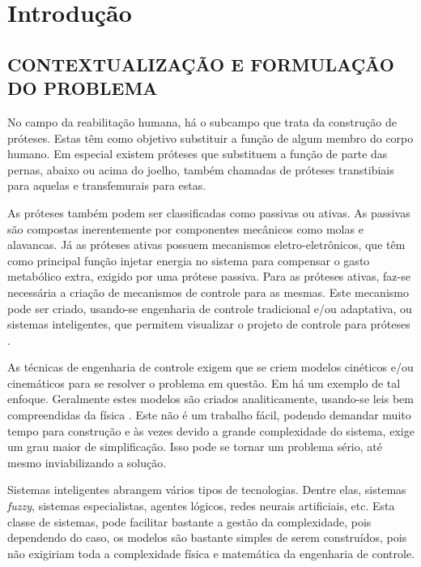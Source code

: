 \chapter[INTRODUÇÃO]{\textbf {Introdução}}
\section{CONTEXTUALIZAÇÃO E FORMULAÇÃO DO PROBLEMA}

No campo da reabilitação humana, há o subcampo que trata da construção de próteses. 
Estas têm como objetivo substituir a função de algum membro do corpo humano. 
Em especial existem próteses que substituem a função de parte das pernas, abaixo ou acima do joelho, também chamadas de próteses transtibiais para aquelas e transfemurais para estas.

As próteses também podem ser classificadas como passivas ou ativas. As passivas são compostas inerentemente por componentes mecânicos como molas e alavancas. 
Já as próteses ativas possuem mecanismos eletro-eletrônicos, que têm como principal função injetar energia no sistema para compensar o gasto metabólico extra, exigido por uma prótese passiva. 
Para as próteses ativas, faz-se necessária a criação de mecanismos de controle para as mesmas.
Este mecanismo pode ser criado, usando-se engenharia de controle tradicional e/ou adaptativa, ou sistemas inteligentes, que permitem visualizar o projeto de controle para próteses \cite{Borjian2008}. 

As técnicas de engenharia de controle \cite{Golnaraghi2010} exigem que se criem modelos cinéticos e/ou cinemáticos para se resolver o problema em questão. 
Em \cite{Borjian2008} há um exemplo de tal enfoque. 
Geralmente estes modelos são criados analiticamente, usando-se leis bem compreendidas da física \cite{Garcia2009a}.
Este não é um trabalho fácil, podendo demandar muito tempo para construção e às vezes devido a grande complexidade do sistema, exige um grau maior de simplificação.
Isso pode se tornar um problema sério, até mesmo inviabilizando a solução.

Sistemas inteligentes \cite{Russel2010} abrangem vários tipos de tecnologias.
Dentre elas, sistemas \emph{fuzzy}, sistemas especialistas, agentes lógicos, redes neurais artificiais, etc.
Esta classe de sistemas, pode facilitar bastante a gestão da complexidade, pois dependendo do caso, os modelos são bastante simples de serem construídos, pois não exigiriam toda a complexidade física e matemática da engenharia de controle.

